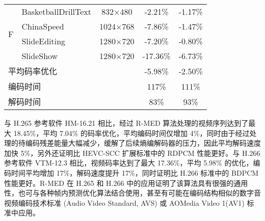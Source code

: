 \begin{table}[!p]
\begin{tabular}{@{}clccc@{}}
        \multirow{4}{*}{F}               & BasketballDrillText                       & 832$\times$480          & -2.21\%                            & -1.17\%                    \\
                                         & ChinaSpeed                                & 1024$\times$768         & -7.86\%                            & -1.47\%                    \\
                                         & SlideEditing                              & 1280$\times$720         & -7.20\%                            & -0.80\%                    \\
                                         & SlideShow                                 & 1280$\times$720         & -17.36\%                           & -6.73\%                    \\ \midrule
        \multicolumn{2}{l}{平均码率优化} &                                           & -5.98\%                 & -2.50\%                                                         \\ \midrule
        \multicolumn{2}{l}{编码时间}     &                                           & 117\%                   & 111\%                                                           \\ \midrule
        \multicolumn{2}{l}{解码时间}     &                                           & 83\%                    & 93\%                                                            \\ \bottomrule
    \end{tabular}
\end{table}

与 H.265 参考软件 HM-16.21 相比，经过 R-MED 算法处理的视频序列达到了最大 18.45\%，平均 7.04\% 的码率优化，平均编码时间仅增加 4\%，同时由于经过处理的待编码残差能量大幅减少，缓解了后续熵编解码器的压力，因此平均解码速度加快 5\%，另外还证明比 HEVC-SCC 扩展标准中的 RDPCM 性能更好。与 H.266 参考软件 VTM-12.3 相比，视频码率达到了最大 17.36\%，平均 5.98\% 的优化，编码时间平均增加 17\%，解码速度提升 17\%，同时证明比 H.266 标准中的 BDPCM 性能更好。R-MED 在 H.265 和 H.266 中的应用证明了该算法具有很强的通用性，也可与各种帧内预测优化算法结合使用，甚至有可能在编码结构相似的数字音视频编码技术标准 (Audio Video Standard, AVS) 或 AOMedia Video 1(AV1) 标准中应用。

